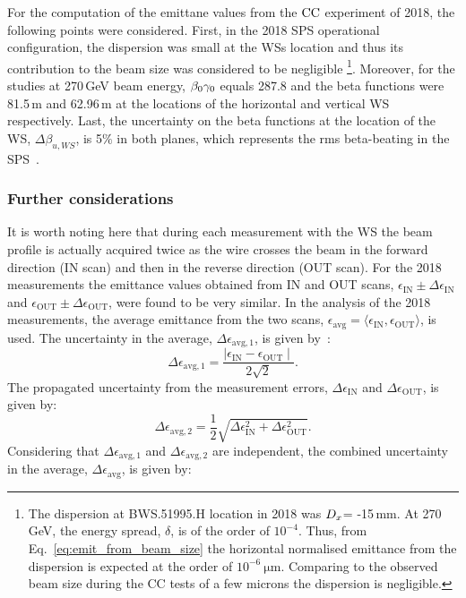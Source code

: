 For the computation of the emittane values from the ${\mathrm{CC}}$ experiment of 2018, the following points were considered. First, in the 2018 SPS operational configuration, the dispersion was small at the WSs location and thus its contribution to the beam size was considered to be negligible \footnote{The dispersion at BWS.51995.H location in 2018 was ${D_x}$= -15\,mm. At 270\,GeV, the energy spread, $\delta$, is of the order of $\mathrm{10^{-4}}$. Thus, from Eq.~\eqref{eq:emit_from_beam_size} the horizontal normalised emittance from the dispersion is expected at the order of $\mathrm{10^{-6} \ \mu m}$. Comparing to the observed beam size during the CC tests of a few microns the dispersion is negligible. \color{red}{The measured $\Dx, \Dy$ were found to be very small and thus their contribution is also considered negligible. The plan is to perform some measurments in 2022 to get a feeling of their values at the location of the wire scanners}}. Moreover, for the studies at 270\,GeV beam energy, ${\beta_0} {\gamma_0}$ equals 287.8 and the beta functions were 81.5\,m and 62.96\,m at the locations of the horizontal and vertical WS respectively. Last, the uncertainty on the beta functions at the location of the WS, $\Delta \beta_{u, WS}$, is 5$\%$ in both planes, which represents the rms beta-beating in the SPS~\cite{SPS-beta-beating-Rogelio}.
\subsubsection*{Further considerations}
It is worth noting here that during each measurement with the WS the beam profile is actually acquired twice as the wire crosses the beam in the forward direction (IN scan) and then in the reverse direction (OUT scan). For the 2018 measurements the emittance values obtained from IN and OUT scans, $\epsilon_\mathrm{IN} \pm \Delta \epsilon_\mathrm{IN}$ and $\epsilon_\mathrm{OUT} \pm \Delta \epsilon_\mathrm{OUT}$, were found to be very similar. In the analysis of the 2018 measurements, the average emittance from the two scans, $\epsilon_\mathrm{avg} = \langle \epsilon_\mathrm{IN}, \epsilon_\mathrm{OUT}\rangle$, is used. The uncertainty in the average, $\Delta \epsilon_\mathrm{avg, 1}$, is given by~\cite{uncertainty_in_the_mean}: 
\begin{equation}\label{eq:uncertainty_mean_ws}
   \Delta \epsilon_\mathrm{avg, 1} = \frac{\mid \epsilon_\mathrm{IN} - \epsilon_\mathrm{OUT} \mid}{2 \sqrt{2}}.
\end{equation}
The propagated uncertainty from the measurement errors, $\Delta \epsilon_\mathrm{IN}$ and $\Delta \epsilon_\mathrm{OUT}$, is given by:
\begin{equation}\label{eq:propagated_uncertainty_ws}
   \Delta \epsilon_\mathrm{avg, 2} = \frac{1}{2}\sqrt{ \Delta \epsilon_\mathrm{IN}^2 + \Delta \epsilon_\mathrm{OUT}^2}.
\end{equation}
Considering that $\Delta \epsilon_\mathrm{avg, 1}$ and $\Delta \epsilon_\mathrm{avg, 2}$ are independent, the combined uncertainty in the average, $\Delta \epsilon_\mathrm{avg}$, is given by:

